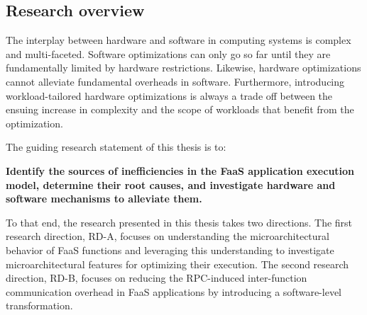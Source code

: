 \documentclass[../main.tex]{subfiles}
\begin{document}
\begin{refsection}[main-bib]


\section{Research overview}
\label{sec:res-overview}

The interplay between hardware and software in computing systems is
complex and multi-faceted. Software optimizations can only go so far
until they are fundamentally limited by hardware
restrictions. Likewise, hardware optimizations cannot alleviate
fundamental overheads in software. Furthermore, introducing
workload-tailored hardware optimizations is always a trade off between
the ensuing increase in complexity and the scope of workloads that
benefit from the optimization.

The guiding research statement of this thesis is to:
\begin{framed}
\noindent
\textbf{Identify the sources of inefficiencies in the FaaS application execution model, determine their root causes, and investigate hardware and software mechanisms to alleviate them.}
\end{framed}
\noindent
To that end, the research presented in this thesis takes two
directions. The first research direction, RD-A, focuses on
understanding the microarchitectural behavior of FaaS functions and
leveraging this understanding to investigate microarchitectural
features for optimizing their execution.
The second research direction, RD-B, focuses on reducing the
RPC-induced inter-function communication overhead in FaaS applications by
introducing a software-level transformation.



\end{refsection}
\end{document}
